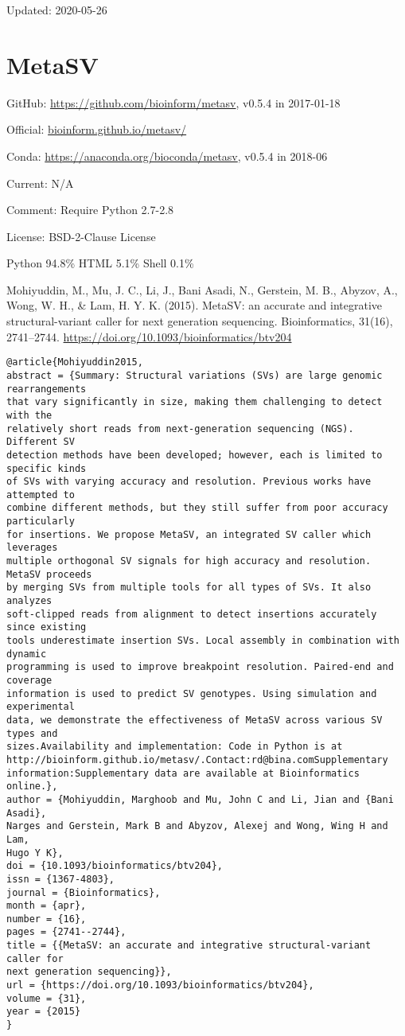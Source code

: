 \documentclass[]{article}
\begin{document}
Updated: 2020-05-26

\section{MetaSV}

GitHub: \url{https://github.com/bioinform/metasv}, v0.5.4 in 2017-01-18

Official: \url{bioinform.github.io/metasv/}

Conda: \url{https://anaconda.org/bioconda/metasv}, v0.5.4 in 2018-06

Current: N/A

Comment: Require Python 2.7-2.8

License: BSD-2-Clause License

Python 94.8\% HTML 5.1\% Shell 0.1\%

Mohiyuddin, M., Mu, J. C., Li, J., Bani Asadi, N., Gerstein, M. B., Abyzov, A., Wong, W. H., \& Lam, H. Y. K. (2015). MetaSV: an accurate and integrative structural-variant caller for next generation sequencing. Bioinformatics, 31(16), 2741–2744. \url{https://doi.org/10.1093/bioinformatics/btv204}

\begin{verbatim}
@article{Mohiyuddin2015,
abstract = {Summary: Structural variations (SVs) are large genomic rearrangements
that vary significantly in size, making them challenging to detect with the
relatively short reads from next-generation sequencing (NGS). Different SV
detection methods have been developed; however, each is limited to specific kinds
of SVs with varying accuracy and resolution. Previous works have attempted to
combine different methods, but they still suffer from poor accuracy particularly
for insertions. We propose MetaSV, an integrated SV caller which leverages
multiple orthogonal SV signals for high accuracy and resolution. MetaSV proceeds
by merging SVs from multiple tools for all types of SVs. It also analyzes
soft-clipped reads from alignment to detect insertions accurately since existing
tools underestimate insertion SVs. Local assembly in combination with dynamic
programming is used to improve breakpoint resolution. Paired-end and coverage
information is used to predict SV genotypes. Using simulation and experimental
data, we demonstrate the effectiveness of MetaSV across various SV types and
sizes.Availability and implementation: Code in Python is at
http://bioinform.github.io/metasv/.Contact:rd@bina.comSupplementary
information:Supplementary data are available at Bioinformatics online.},
author = {Mohiyuddin, Marghoob and Mu, John C and Li, Jian and {Bani Asadi},
Narges and Gerstein, Mark B and Abyzov, Alexej and Wong, Wing H and Lam,
Hugo Y K},
doi = {10.1093/bioinformatics/btv204},
issn = {1367-4803},
journal = {Bioinformatics},
month = {apr},
number = {16},
pages = {2741--2744},
title = {{MetaSV: an accurate and integrative structural-variant caller for
next generation sequencing}},
url = {https://doi.org/10.1093/bioinformatics/btv204},
volume = {31},
year = {2015}
}
\end{verbatim}
\end{document}
